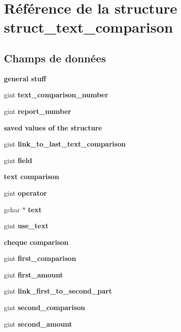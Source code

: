 \section{Référence de la structure struct\_\-text\_\-comparison}
\label{structstruct__text__comparison}
\subsection*{Champs de données}
\begin{Indent}{\bf general stuff}\par
{\em \label{_amgrp52b07cac44d92ce9f787d506234f1ad4}
 }\begin{DoxyCompactItemize}
\item 
gint {\bf text\_\-comparison\_\-number}
\item 
gint {\bf report\_\-number}
\end{DoxyCompactItemize}
\end{Indent}
\begin{Indent}{\bf saved values of the structure}\par
{\em \label{_amgrp82e82302acb5acd2c4ecfd61e3ccfadc}
 }\begin{DoxyCompactItemize}
\item 
gint {\bf link\_\-to\_\-last\_\-text\_\-comparison}
\item 
gint {\bf field}
\end{DoxyCompactItemize}
\end{Indent}
\begin{Indent}{\bf text comparison}\par
{\em \label{_amgrp544698fc0366dd3326236960d86fdfb0}
 }\begin{DoxyCompactItemize}
\item 
gint {\bf operator}
\item 
gchar $\ast$ {\bf text}
\item 
gint {\bf use\_\-text}
\end{DoxyCompactItemize}
\end{Indent}
\begin{Indent}{\bf cheque comparison}\par
{\em \label{_amgrp7480e26d21ab8270d44faefb728e7fbc}
 }\begin{DoxyCompactItemize}
\item 
gint {\bf first\_\-comparison}
\item 
gint {\bf first\_\-amount}
\item 
gint {\bf link\_\-first\_\-to\_\-second\_\-part}
\item 
gint {\bf second\_\-comparison}
\item 
gint {\bf second\_\-amount}
\end{DoxyCompactItemize}
\end{Indent}
